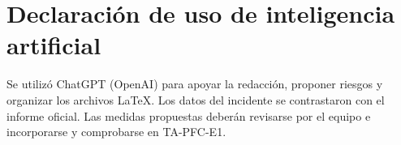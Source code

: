 \documentclass[10pt,a4paper]{article}
\begin{document}

\setcounter{page}{1}


\clearpage
\section*{Declaración de uso de inteligencia artificial}
Se utilizó ChatGPT (OpenAI) para apoyar la redacción, proponer riesgos y organizar los archivos LaTeX. Los datos del incidente se contrastaron con el informe oficial. Las medidas propuestas deberán revisarse por el equipo e incorporarse y comprobarse en TA-PFC-E1.


\end{document}
